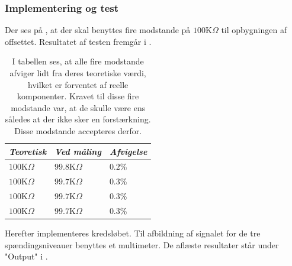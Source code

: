 \subsubsection{Implementering og test}
Der ses på , at der skal benyttes fire modstande på $100$K$\Omega$ til opbygningen af offsettet. Resultatet af testen fremgår i .
\begin{table}[H]
	\centering
	\begin{tabular}{|l|l|l|}
		\hline
		\textit{Teoretisk} & \textit{Ved måling} & \textit{Afvigelse} \\ \hline
		$100$K$\Omega$       & $99.8$K$\Omega$       & $0.2$\%               \\ \hline
		$100$K$\Omega$       & $99.7$K$\Omega$       & $0.3$\%               \\ \hline
		$100$K$\Omega$       & $99.7$K$\Omega$       & $0.3$\%               \\ \hline
		$100$K$\Omega$       & $99.7$K$\Omega$       & $0.3$\%               \\ \hline
	\end{tabular}
	\caption{I tabellen ses, at alle fire modstande afviger lidt fra deres teoretiske værdi, hvilket er forventet af reelle komponenter. Kravet til disse fire modstande var, at de skulle være ens således at der ikke sker en forstærkning. Disse modstande accepteres derfor.}
	\label{Tab:modstand_offset}
\end{table}
\noindent Herefter implementeres kredsløbet. Til afbildning af signalet for de tre spændingsniveauer benyttes et multimeter. De aflæste resultater står under "Output" i .
